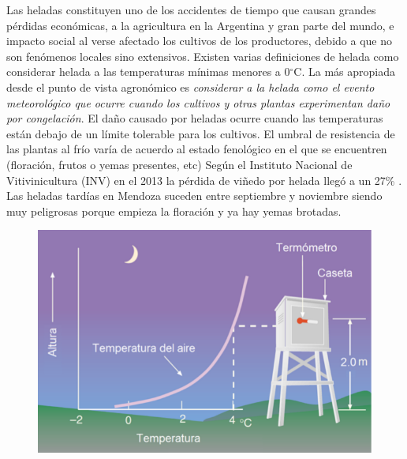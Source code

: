 \documentclass[final,a4paper]{llncs}
\newcommand{\degree}{$^{\circ}$}
\begin{document}
Las heladas constituyen uno de los accidentes de tiempo que causan grandes pérdidas 
económicas, a la agricultura en la Argentina y gran parte del mundo, e impacto
social al verse afectado los cultivos de los productores, debido a que no son fenómenos 
locales sino extensivos. Existen varias definiciones de helada como considerar helada a las 
temperaturas mínimas menores a 0\degree C. La más apropiada desde el punto de vista agronómico
es \emph{considerar a la helada como el evento meteorológico que ocurre cuando los cultivos 
y otras plantas experimentan daño por congelación}. El daño causado por heladas ocurre 
cuando las temperaturas están debajo de un límite tolerable para
los cultivos. El umbral de resistencia de las plantas al frío varía de acuerdo 
al estado fenológico en el que se encuentren (floración, frutos o yemas presentes, etc) 
Según el Instituto Nacional de Vitivinicultura (INV) en el 2013 la pérdida de viñedo por
helada llegó a un 27\% \cite{inv-news}. Las heladas tardías en Mendoza suceden entre septiembre y noviembre
siendo muy peligrosas porque empieza la floración y ya hay yemas brotadas. 

\begin{figure}[h]
\includegraphics[width=0.70\columnwidth]{casilla.png}
\end{figure}\label{fig:casilla}
\end{document}
